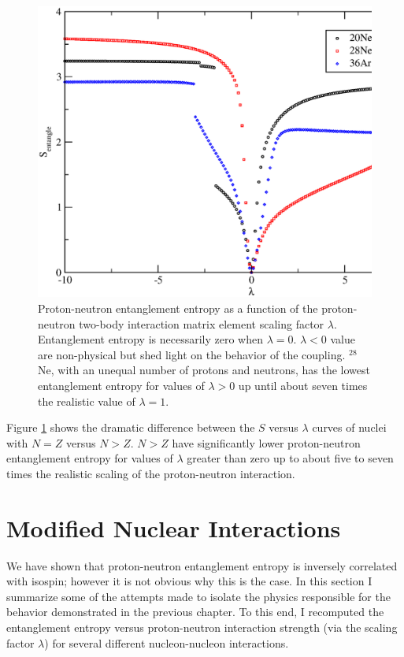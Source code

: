 \begin{figure}[t]
    \centering
    \includegraphics[width=.75\textwidth,clip]{Figures/s_vs_lambda_28ne}
    \caption{Proton-neutron entanglement entropy as a function of the proton-neutron
two-body interaction matrix element scaling factor \boldmath$\lambda$. Entanglement entropy
is necessarily zero when $\lambda=0$. $\lambda<0$ value are non-physical but
shed light on the behavior of the coupling. $^{28}$Ne, with an unequal number 
of protons and neutrons, has the lowest entanglement entropy for values of 
$\lambda>0$ up until about seven times the realistic value of $\lambda=1$.}
    \label{fig: l28ne}
\end{figure}

Figure \ref{fig: l28ne} shows the dramatic difference between the 
$S$ versus $\lambda$ curves of nuclei with $N=Z$ versus $N>Z$.
$N>Z$ have significantly lower proton-neutron entanglement entropy
for values of $\lambda$ greater than zero up to about five to
seven times the realistic scaling of the proton-neutron
interaction. 


\section{Modified Nuclear Interactions}
We have shown that proton-neutron entanglement entropy is inversely correlated with
isospin; however it is not obvious why this is the case. 
In this section I summarize some of the attempts made to 
isolate the physics responsible for the behavior demonstrated 
in the previous chapter. To this end,
I recomputed the entanglement entropy versus proton-neutron interaction
strength (via the scaling factor $\lambda$) for several different
nucleon-nucleon interactions.

